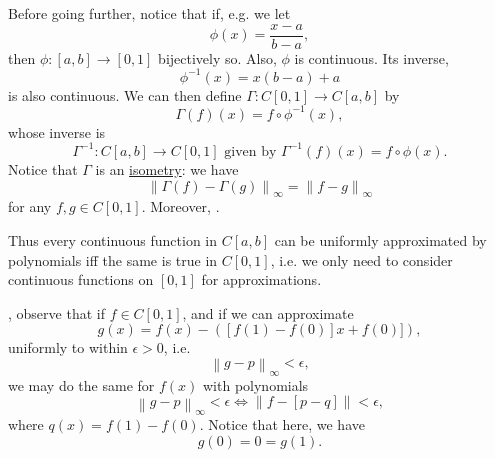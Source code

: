 \documentclass[notoc,notitlepage]{tufte-book}
\newcommand{\norm}[1]{\left\| #1 \right\|}
\begin{document}
Before going further, notice that if, e.g. we let
\begin{equation*}
  \phi(x) = \frac{x - a}{b - a},
\end{equation*}
then $\phi : [a, b] \to [0, 1]$ bijectively so. Also, $\phi$ is continuous. Its inverse,
\begin{equation*}
  \phi^{-1}(x) = x(b - a) + a
\end{equation*}
is also continuous. We can then define $\Gamma: C[0, 1] \to C[a, b]$ by
\begin{equation*}
  \Gamma(f)(x) = f \circ \phi^{-1}(x),
\end{equation*}
whose inverse is
\begin{equation*}
  \Gamma^{-1} : C[a, b] \to C[0, 1] \text{ given by } \Gamma^{-1}(f)(x) = f \circ \phi(x).
\end{equation*}
Notice that $\Gamma$ is an \hyperref[defn:isometry]{isometry}: we have
\begin{equation*}
  \norm{ \Gamma(f) - \Gamma(g) }_\infty = \norm{ f - g }_\infty
\end{equation*}
for any $f, g \in C[0, 1]$. Moreover, .

Thus every continuous function in $C[a, b]$ can be uniformly approximated by polynomials iff the same is true in $C[0, 1]$, i.e. we only need to consider continuous functions on $[0, 1]$ for approximations.

, observe that if $f \in C[0, 1]$, and if we can approximate
\begin{equation*}
  g(x) = f(x) - ([f(1) - f(0)] x + f(0)]),
\end{equation*}
uniformly to within $\epsilon > 0$, i.e.
\begin{equation*}
  \norm{ g - p }_\infty < \epsilon,
\end{equation*}
we may do the same for $f(x)$ with polynomials
\begin{equation*}
  \norm{g - p}_\infty < \epsilon \iff \norm{ f - [p - q] } < \epsilon,
\end{equation*}
where $q(x) = f(1) - f(0)$. Notice that here, we have
\begin{equation*}
  g(0) = 0 = g(1).
\end{equation*}



\end{document}
